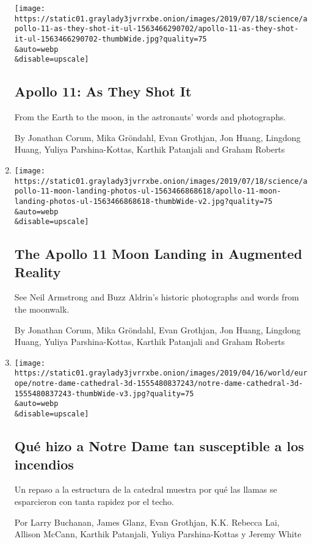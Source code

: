 \begin{enumerate}
  \texttt{[image: https://static01.graylady3jvrrxbe.onion/images/2019/07/18/science/apollo-11-as-they-shot-it-ul-1563466290702/apollo-11-as-they-shot-it-ul-1563466290702-thumbWide.jpg?quality=75\\\&auto=webp\\\&disable=upscale]}

  \hypertarget{apollo-11-as-they-shot-it}{%
  \subsection{Apollo 11: As They Shot
  It}\label{apollo-11-as-they-shot-it}}

  From the Earth to the moon, in the astronauts' words and photographs.

  By Jonathan Corum, Mika Gröndahl, Evan Grothjan, Jon Huang, Lingdong
  Huang, Yuliya Parshina-Kottas, Karthik Patanjali and Graham Roberts
\item
  \href{/interactive/2019/07/18/science/apollo-11-moon-landing-photos-ul.html}{}

  \texttt{[image: https://static01.graylady3jvrrxbe.onion/images/2019/07/18/science/apollo-11-moon-landing-photos-ul-1563466868618/apollo-11-moon-landing-photos-ul-1563466868618-thumbWide-v2.jpg?quality=75\\\&auto=webp\\\&disable=upscale]}

  \hypertarget{the-apollo-11-moon-landing-in-augmented-reality}{%
  \subsection{The Apollo 11 Moon Landing in Augmented
  Reality}\label{the-apollo-11-moon-landing-in-augmented-reality}}

  See Neil Armstrong and Buzz Aldrin's historic photographs and words
  from the moonwalk.

  By Jonathan Corum, Mika Gröndahl, Evan Grothjan, Jon Huang, Lingdong
  Huang, Yuliya Parshina-Kottas, Karthik Patanjali and Graham Roberts
\item
  \href{/es/interactive/2019/04/17/universal/catedral-atico.html}{}

  \texttt{[image: https://static01.graylady3jvrrxbe.onion/images/2019/04/16/world/europe/notre-dame-cathedral-3d-1555480837243/notre-dame-cathedral-3d-1555480837243-thumbWide-v3.jpg?quality=75\\\&auto=webp\\\&disable=upscale]}

  \hypertarget{quuxe9-hizo-a-notre-dame-tan-susceptible-a-los-incendios}{%
  \subsection{Qué hizo a Notre Dame tan susceptible a los
  incendios}\label{quuxe9-hizo-a-notre-dame-tan-susceptible-a-los-incendios}}

  Un repaso a la estructura de la catedral muestra por qué las llamas se
  esparcieron con tanta rapidez por el techo.

  Por Larry Buchanan, James Glanz, Evan Grothjan, K.K. Rebecca Lai,
  Allison McCann, Karthik Patanjali, Yuliya Parshina-Kottas y Jeremy
  White
\end{enumerate}

